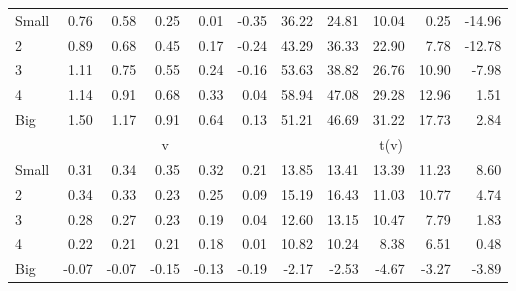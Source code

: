\begin{table}[!ht]
\begin{tabular}{lrrrrrrrrrr}
    \\
      \cmidrule(r){2-6} \cmidrule(r){7-11}

    Small   & 0.76  & 0.58  & 0.25  & 0.01  & -0.35  & 36.22  & 24.81  & 10.04  & 0.25  & -14.96  \\
         2  & 0.89  & 0.68  & 0.45  & 0.17  & -0.24  & 43.29  & 36.33  & 22.90  & 7.78  & -12.78  \\
         3  & 1.11  & 0.75  & 0.55  & 0.24  & -0.16  & 53.63  & 38.82  & 26.76  & 10.90  & -7.98  \\
         4  & 1.14  & 0.91  & 0.68  & 0.33  & 0.04  & 58.94  & 47.08  & 29.28  & 12.96  & 1.51  \\
    Big     & 1.50  & 1.17  & 0.91  & 0.64  & 0.13  & 51.21  & 46.69  & 31.22  & 17.73  & 2.84  \\

  
    
      & \multicolumn{5}{c}{v} & \multicolumn{5}{c}{t(v)}
    
    \\
      \cmidrule(r){2-6} \cmidrule(r){7-11}

    Small   & 0.31  & 0.34  & 0.35  & 0.32  & 0.21  & 13.85  & 13.41  & 13.39  & 11.23  & 8.60  \\
         2  & 0.34  & 0.33  & 0.23  & 0.25  & 0.09  & 15.19  & 16.43  & 11.03  & 10.77  & 4.74  \\
         3  & 0.28  & 0.27  & 0.23  & 0.19  & 0.04  & 12.60  & 13.15  & 10.47  & 7.79  & 1.83  \\
         4  & 0.22  & 0.21  & 0.21  & 0.18  & 0.01  & 10.82  & 10.24  & 8.38  & 6.51  & 0.48  \\
    Big     & -0.07  & -0.07  & -0.15  & -0.13  & -0.19  & -2.17  & -2.53  & -4.67  & -3.27  & -3.89  \\

  

  \bottomrule
\end{tabular}
\label{tbl:25_Size_Beta_FF1993}
\end{table}